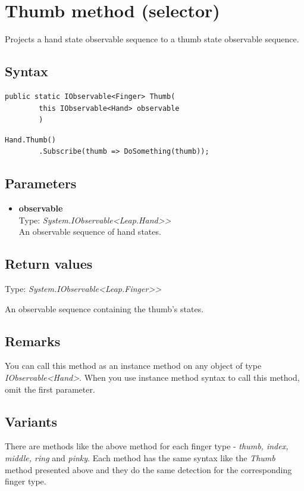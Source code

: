 \documentclass[12pt,a4paper,twoside]{report}
\begin{document}
\section{Thumb method (selector)}
Projects a hand state observable sequence to a thumb state observable sequence.

\subsection{Syntax}

\begin{lstlisting}[caption=Declaration]
    public static IObservable<Finger> Thumb(
        this IObservable<Hand> observable
        )
\end{lstlisting}

\begin{lstlisting}[caption=Usage example]
    Hand.Thumb()
        .Subscribe(thumb => DoSomething(thumb));
\end{lstlisting}

\subsection{Parameters}
\begin{itemize}
    \item \textbf{observable}\\
        Type: \textit{System.IObservable<Leap.Hand>{}>}\\
        An observable sequence of hand states.
\end{itemize}

\subsection{Return values}
Type: \textit{System.IObservable<Leap.Finger>{}>}

An observable sequence containing the thumb's states.

\subsection{Remarks}
You can call this method as an instance method on any object of type \textit{IObservable<Hand>}. When you use 
instance method syntax to call this method, omit the first parameter.

\subsection{Variants}
There are methods like the above method for each finger type - \textit{thumb, index, middle, ring} and \textit{pinky}. Each method has the same syntax like the \textit{Thumb} method presented above and they do the same detection for the corresponding finger type.
\end{document}
